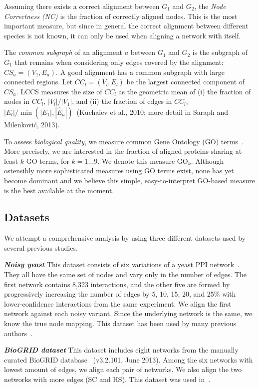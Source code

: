 \documentclass{bioinfo}
\newcommand{\Eb}{\hat{E}}
\begin{document}
Assuming there exists a correct alignment between $G_1$ and $G_2$, the {\it Node Correctness (NC)} is the fraction of correctly aligned nodes. This is the most important measure, but since in general the correct alignment between different species is not known, it can only be used when aligning a network with itself.

The \textit{common subgraph} of an alignment $a$ between $G_1$ and $G_2$ is the subgraph of $G_1$ that remains when considering only edges covered by the alignment: $CS_a=(V_1,E_a)$. A good alignment has a common subgraph with large connected regions. Let $CC_l=(V_l,E_l)$ be the largest connected component of $CS_a$. LCCS measures the size of $CC_l$ as the geometric mean of (i) the fraction of nodes in $CC_l$, $|V_l|/|V_1|$, and (ii) the fraction of edges in $CC_l$, $|E_l|/\min(|E_1|,|\Eb_a|)$~(Kuchaiev et al., 2010; more detail in Saraph and Milenkovi\'{c}, 2013).

To assess {\it biological quality}, we measure common Gene Ontology (GO) terms~\citep{GOterms}. More precisely, we are interested in the fraction of aligned proteins sharing at least $k$ GO terms, for $k=1\ldots 9$. We denote this measure $\mbox{GO}_k$. Although ostensibly more sophisticated measures using GO terms exist, none has yet become dominant and we believe this simple, easy-to-interpret GO-based measure is the best available at the moment.

\subsection{Datasets}\label{datadescription}

We attempt a comprehensive analysis by using three different datasets used by several previous studies.

\emph{\textbf{Noisy yeast}} This dataset consists of six variations of a yeast PPI network~\citep{Collins01032007}. They all have the same set of nodes and vary only in the number of edges. The first network contains 8,323 interactions, and the other five are formed by progressively increasing the number of edges by 5, 10, 15, 20, and 25\% with lower-confidence interactions from the same experiment. We align the first network against each noisy variant. Since the underlying network is the same, we know the true node mapping. This dataset has been used by many previous authors~\citep{MAGNA,GHOST,WAVE,GREAT}.

\emph{\textbf{BioGRID dataset}} This dataset includes eight networks from the manually curated BioGRID database~\citep{Chatr-aryamontri01012013} (v3.2.101, June 2013). Among the six networks with lowest amount of edges, we align each pair of networks. We also align the two networks with more edges (SC and HS). This dataset was used in~\cite{LGRAAL}.
\end{document}
